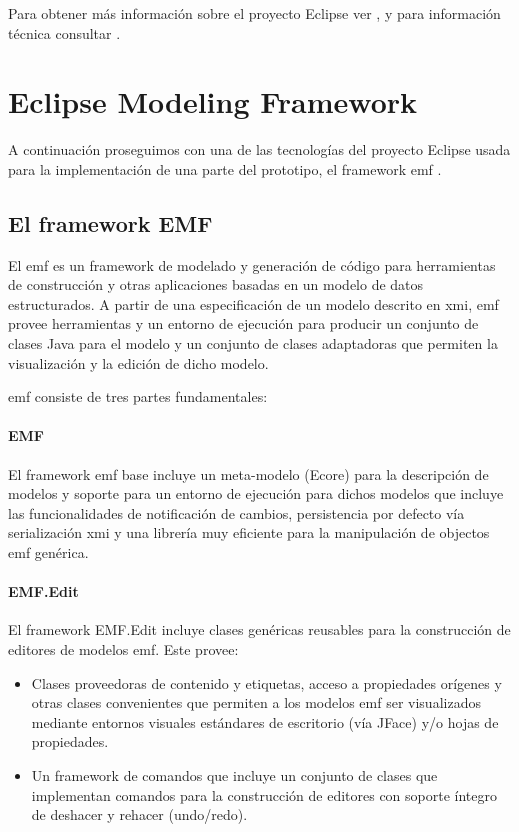 \documentclass[a4paper,12pt,oneside,spanish]{book}
\begin{document}
Para obtener más información sobre el proyecto Eclipse ver \cite[\url{www.eclipse.org}]{Eclipse}, y para información técnica consultar \cite[Eclipse Platform Technical Overview]{EclipseTech}.


\section{Eclipse Modeling Framework}

A continuación proseguimos con una de las tecnologías del proyecto Eclipse usada para la implementación de una parte del prototipo, el framework \gls{emf} \cite{EMF}.

\subsection{El framework EMF}

El \gls{emf} es un framework de modelado y generación de código para herramientas de construcción y otras aplicaciones basadas en un modelo de datos estructurados. A partir de una especificación de un modelo descrito en \gls{xmi}, \gls{emf} provee herramientas y un entorno de ejecución para producir un conjunto de clases Java para el modelo y un conjunto de clases adaptadoras que permiten la visualización y la edición de dicho modelo.

\gls{emf} consiste de tres partes fundamentales:

\paragraph{EMF}

El framework \gls{emf} base incluye un meta-modelo (Ecore) para la descripción de modelos y soporte para un entorno de ejecución para dichos modelos que incluye las funcionalidades de notificación de cambios, persistencia por defecto vía serialización \gls{xmi} y una librería muy eficiente para la manipulación de objectos \gls{emf} genérica.

\paragraph{EMF.Edit}

El framework EMF.Edit incluye clases genéricas reusables para la construcción de editores de modelos \gls{emf}. Este provee:

\begin{itemize}

\item Clases proveedoras de contenido y etiquetas, acceso a propiedades orígenes y otras clases convenientes que permiten a los modelos \gls{emf} ser visualizados mediante entornos visuales estándares de escritorio (vía JFace) y/o hojas de propiedades.

\item Un framework de comandos que incluye un conjunto de clases que implementan comandos para la construcción de editores con soporte íntegro de deshacer y rehacer (undo/redo).

\end{itemize}
\end{document}
